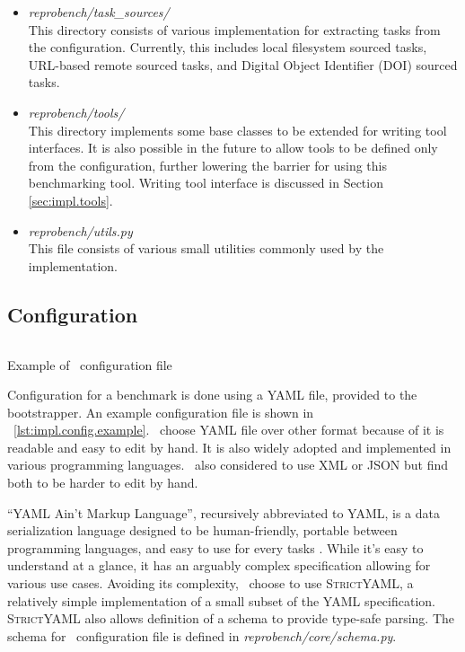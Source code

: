 \begin{itemize}
    \item \emph{reprobench/task\_sources/}\\
          This directory consists of various implementation for extracting tasks from the configuration.
          Currently, this includes local filesystem sourced tasks, URL-based remote sourced tasks, and Digital Object Identifier (DOI) sourced tasks.

    \item \emph{reprobench/tools/}\\
          This directory implements some base classes to be extended for writing tool interfaces.
          It is also possible in the future to allow tools to be defined only from the configuration, further lowering the barrier for using this benchmarking tool.
          Writing tool interface is discussed in Section \ref{sec:impl.tools}.

    \item \emph{reprobench/utils.py}\\
          This file consists of various small utilities commonly used by the implementation.


\end{itemize}


\subsection{Configuration}

\begin{listing}
    \inputminted{yaml}{assets/listings/reprobench/examples/sat/benchmark.yml}
    \caption{Example of \OurBenchmarkingTool~configuration file}
    \label{lst:impl.config.example}
\end{listing}

Configuration for a benchmark is done using a YAML file, provided to the bootstrapper.
An example configuration file is shown in \lst~\ref{lst:impl.config.example}.
\First~choose YAML file over other format because of it is readable and easy to edit by hand.
It is also widely adopted and implemented in various programming languages.
\First~also considered to use XML or JSON but find both to be harder to edit by hand.

``YAML Ain’t Markup Language'', recursively abbreviated to YAML, is a data serialization language designed to be human-friendly, portable between programming languages, and easy to use for every tasks \citep{ben2005yaml}.
While it's easy to understand at a glance, it has an arguably complex specification allowing for various use cases.
Avoiding its complexity, \first~choose to use \textsc{StrictYAML}, a relatively simple implementation of a small subset of the YAML specification.
\textsc{StrictYAML} also allows definition of a schema to provide type-safe parsing.
The schema for \OurBenchmarkingTool~configuration file is defined in \emph{reprobench/core/schema.py}.



